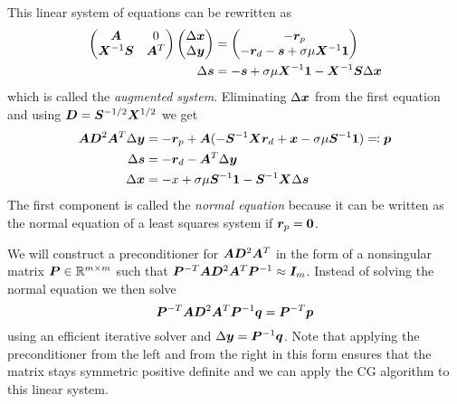 This linear system of equations can be rewritten as
\begin{subequations} \label{eqn:augmented-system}
  \begin{align}
    \begin{pmatrix}
      \bm{A}              & 0 \\
      \bm{X}^{-1} \bm{S} & \bm{A}^T \\
    \end{pmatrix}
    \begin{pmatrix}
      \Delta\bm{x} \\
      \Delta\bm{y}
    \end{pmatrix}
    &=
    \begin{pmatrix}
      -\bm{r}_p \\
      -\bm{r}_d -\bm{s} + \sigma \mu \bm{X}^{-1} \bm{1}
    \end{pmatrix} \\
    \Delta\bm{s} &= -\bm{s} + \sigma \mu \bm{X}^{-1} \bm{1} - \bm{X}^{-1} \bm{S} \Delta\bm{x}
  \end{align}
\end{subequations}
which is called the \emph{augmented system}.
Eliminating \(\Delta\bm{x}\) from the first equation and using \(\bm{D} = \bm{S}^{-1/2} \bm{X}^{1/2}\) we get
\begin{subequations} \label{eqn:normal-equation-system}
  \begin{align}
    \bm{A} \bm{D}^2 \bm{A}^T \Delta\bm{y} &= -\bm{r}_p + \bm{A} ( -\bm{S}^{-1} \bm{X} \bm{r}_d + \bm{x} - \sigma \mu \bm{S}^{-1} \bm{1} ) \eqqcolon \bm{p} \label{eqn:normal-equation} \\
    \Delta\bm{s} &= -\bm{r}_d - \bm{A}^T \Delta\bm{y} \label{eqn:s-from-normal} \\
    \Delta\bm{x} &= -x + \sigma \mu \bm{S}^{-1} \bm{1} - \bm{S}^{-1} \bm{X} \Delta\bm{s} \label{eqn:x-from-normal}
  \end{align}
\end{subequations}
The first component is called the \emph{normal equation} because it can be written as the normal equation of a least squares system if \(\bm{r}_p = \bm{0}\).

We will construct a preconditioner for \(\bm{A} \bm{D}^2 \bm{A}^T\) in the form of a nonsingular matrix \(\bm{P} \in \mathbb{R}^{m \times m}\) such that
\( \bm{P}^{-T} \bm{A} \bm{D}^2 \bm{A}^T \bm{P}^{-1} \approx \bm{I}_m \).
Instead of solving the normal equation we then solve
\begin{equation} \label{eqn:preconditioned-system}
 \bm{P}^{-T} \bm{A} \bm{D}^2 \bm{A}^T \bm{P}^{-1} \bm{q} = \bm{P}^{-T} \bm{p}
\end{equation}
using an efficient iterative solver and \(\Delta\bm{y} = \bm{P}^{-1} \bm{q}\).
Note that applying the preconditioner from the left and from the right in this form ensures that the matrix stays symmetric positive definite and we can apply the CG algorithm to this linear system.

